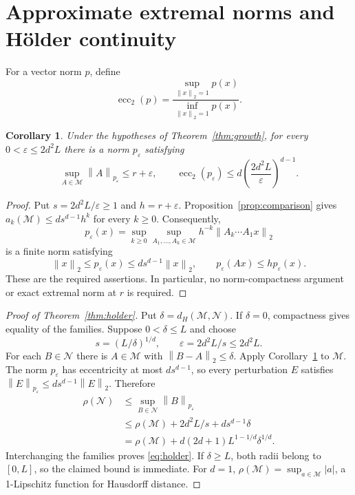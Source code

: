 \documentclass[11pt]{article}
\newtheorem{corollary}[theorem]{Corollary}
\theoremstyle{remark}\newtheorem{remark}[theorem]{Remark}
\newcommand{\norm}[1]{\left\lVert #1\right\rVert_2}
\newcommand{\opnorm}[2]{\left\lVert #1\right\rVert_{#2}}
\newcommand{\ecc}{\operatorname{ecc}_2}
\begin{document}
\section{Approximate extremal norms and H\"older continuity}
For a vector norm $p$, define
\[
 \ecc(p)=\frac{\sup_{\norm x=1}p(x)}{\inf_{\norm x=1}p(x)}.
\]
\begin{corollary}\label{cor:ecc}
Under the hypotheses of Theorem~\ref{thm:growth}, for every $0<\varepsilon\leq2d^2L$ there is a norm $p_\varepsilon$ satisfying
\begin{equation}\label{eq:ecc}
 \sup_{A\in\mathcal M}\opnorm A{p_\varepsilon}
 \leq r+\varepsilon,
 \qquad
 \ecc(p_\varepsilon)\leq d\left(\frac{2d^2L}{\varepsilon}\right)^{d-1}.
\end{equation}
\end{corollary}
\begin{proof}
Put $s=2d^2L/\varepsilon\geq1$ and $h=r+\varepsilon$. Proposition~\ref{prop:comparison} gives $a_k(\mathcal M)\leq d s^{d-1}h^k$ for every $k\geq0$. Consequently,
\[
 p_\varepsilon(x)=\sup_{k\geq0}\sup_{A_1,\ldots,A_k\in\mathcal M}
                     h^{-k}\norm{A_k\cdots A_1x}
\]
is a finite norm satisfying
\[
 \norm x\leq p_\varepsilon(x)\leq d s^{d-1}\norm x,
 \qquad p_\varepsilon(Ax)\leq h p_\varepsilon(x).
\]
These are the required assertions. In particular, no norm-compactness argument or exact extremal norm at $r$ is required.
\end{proof}

\begin{proof}[Proof of Theorem~\ref{thm:holder}]
Put $\delta=d_H(\mathcal M,\mathcal N)$. If $\delta=0$, compactness gives equality of the families. Suppose $0<\delta\leq L$ and choose
\[
 s=(L/\delta)^{1/d},\qquad
 \varepsilon=2d^2L/s\leq2d^2L.
\]
For each $B\in\mathcal N$ there is $A\in\mathcal M$ with $\norm{B-A}\leq\delta$. Apply Corollary~\ref{cor:ecc} to $\mathcal M$. The norm $p_\varepsilon$ has eccentricity at most $d s^{d-1}$, so every perturbation $E$ satisfies $\opnorm E{p_\varepsilon}\leq d s^{d-1}\norm E$. Therefore
\begin{align*}
 \rho(\mathcal N)
 &\leq\sup_{B\in\mathcal N}\opnorm B{p_\varepsilon}\\
 &\leq\rho(\mathcal M)+2d^2L/s+d s^{d-1}\delta\\
 &=\rho(\mathcal M)+d(2d+1)L^{1-1/d}\delta^{1/d}.
\end{align*}
Interchanging the families proves \eqref{eq:holder}. If $\delta\geq L$, both radii belong to $[0,L]$, so the claimed bound is immediate. For $d=1$, $\rho(\mathcal M)=\sup_{a\in\mathcal M}|a|$, a 1-Lipschitz function for Hausdorff distance.
\end{proof}
\end{document}
